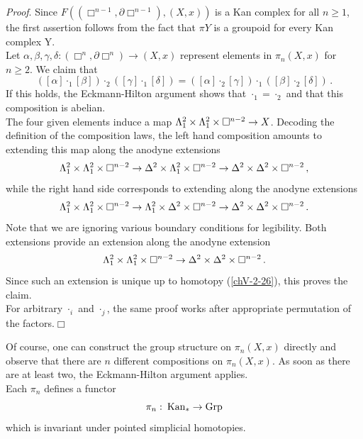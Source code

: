         \emph{Proof}. Since $F((\Box^{n-1}, \partial \Box^{n-1}),(X, x))$ is a Kan complex for all $n \geq 1$, the first assertion follows from the fact that $\pi Y$ is a groupoid for every Kan complex Y.\\
        Let $\alpha, \beta, \gamma, \delta \colon (\Box^n, \partial \Box^n) \to (X, x)$ represent elements in $\pi_n(X, x)$ for $n \geq 2$. We claim that
        \begin{equation*}
            ([\alpha] \cdot_1 [\beta]) \cdot_2 ([\gamma] \cdot_1 [\delta]) = ([\alpha] \cdot_2 [\gamma]) \cdot_1 ([\beta] \cdot_2 [\delta]) \,.
        \end{equation*}
        If this holds, the Eckmann-Hilton argument shows that $\cdot_1 = \cdot_2$ and that this composition is abelian.\\
        The four given elements induce a map $\Lambda^{2}_{1} \times \Lambda^{2}_{1} \times \Box^{n-2} \to X$. Decoding the definition of the composition laws, the left hand composition amounts to extending this map along the anodyne extensions
        \begin{equation*}
            \Lambda^{2}_{1} \times \Lambda^{2}_{1} \times \Box^{n-2} \to \Delta^2 \times \Lambda^{2}_{1} \times \Box^{n-2} \to \Delta^2 \times \Delta^2 \times \Box^{n-2} \,,
        \end{equation*}
        while the right hand side corresponds to extending along the anodyne extensions
        \begin{equation*}
            \Lambda^{2}_{1} \times \Lambda^{2}_{1} \times \Box^{n-2} \to \Lambda^{2}_{1} \times \Delta^2 \times \Box^{n-2} \to \Delta^2 \times \Delta^2 \times \Box^{n-2} \,.
        \end{equation*}
        Note that we are ignoring various boundary conditions for legibility. Both extensions provide an extension along the anodyne extension
        \begin{equation*}
            \Lambda^{2}_{1} \times \Lambda^{2}_{1} \times \Box^{n-2} \to \Delta^2 \times \Delta^2 \times \Box^{n-2} \,.
        \end{equation*}
        Since such an extension is unique up to homotopy (\ref{chV-2-26}), this proves the claim.\\
        For arbitrary $\cdot_i$ and $\cdot_j$, the same proof works after appropriate permutation of the factors.\hfill$\Box$
        \medskip

        Of course, one can construct the group structure on $\pi_n(X, x)$ directly and observe that there are $n$ different compositions on $\pi_n(X, x)$. As soon as there are at least two, the Eckmann-Hilton argument applies.\\
        Each $\pi_n$ defines a functor
        \begin{equation*}
            \pi_n \,\colon \operatorname{Kan}_{*} \to \operatorname{Grp}
        \end{equation*}
        which is invariant under pointed simplicial homotopies.

